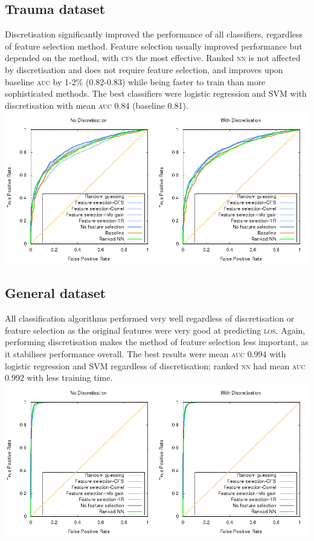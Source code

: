 \documentclass[portrait]{usydposter}
\newcommand{\acronym}[1]{\textsc{#1}\xspace}
\newcommand{\los}{\acronym{los}}
\newcommand{\auc}{\acronym{auc}}
\newcommand{\nn}{\acronym{nn}}
\newcommand{\cfs}{\acronym{cfs}}
\begin{document}
\begin{multicols}{3}
\subsection{Trauma dataset}
Discretisation significantly improved the performance of all classifiers,
regardless of feature selection method. Feature selection usually improved
performance but depended on the method, with \cfs the most effective. Ranked
\nn is not affected by discretisation and does not require feature selection,
and improves upon baseline \auc by 1-2\% (0.82-0.83)
while being faster to train than more sophisticated methods.
The best classifiers were logistic regression
and SVM with discretisation with mean \auc 0.84 (baseline 0.81).
\includegraphics[scale=0.53]{trauma}

\subsection{General dataset}
All classification algorithms performed very well regardless of discretisation
or feature selection as the original features were very good at predicting
\los. Again, performing discretisation makes the method of feature selection
less important, as it stabilises performance overall. The best results were
mean \auc 0.994 with logistic regression and SVM regardless of discretisation;
ranked \nn had mean \auc 0.992 with less training time.
\includegraphics[scale=0.53]{portugal}


\end{multicols}
\end{document}
